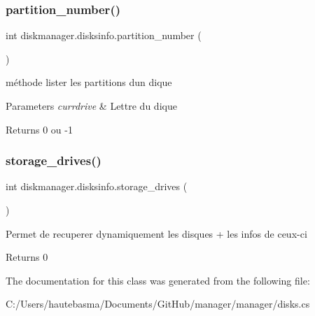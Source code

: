 \subsubsection{\texorpdfstring{partition\+\_\+number()}{partition\_number()}}
{\footnotesize\ttfamily int diskmanager.\+disksinfo.\+partition\+\_\+number (\begin{DoxyParamCaption}{ }\end{DoxyParamCaption})}



méthode lister les partitions d\textquotesingle{}un dique 


\begin{DoxyParams}{Parameters}
{\em currdrive} & Lettre du dique\\
\hline
\end{DoxyParams}
\begin{DoxyReturn}{Returns}
0 ou -\/1
\end{DoxyReturn}
\mbox{\label{classdiskmanager_1_1disksinfo_ae387fb2ba0e32b521f377aa814f29508}} 
\subsubsection{\texorpdfstring{storage\+\_\+drives()}{storage\_drives()}}
{\footnotesize\ttfamily int diskmanager.\+disksinfo.\+storage\+\_\+drives (\begin{DoxyParamCaption}{ }\end{DoxyParamCaption})}



Permet de recuperer dynamiquement les disques + les infos de ceux-\/ci 

\begin{DoxyReturn}{Returns}
0
\end{DoxyReturn}


The documentation for this class was generated from the following file\+:\begin{DoxyCompactItemize}
\item 
C\+:/\+Users/hautebasma/\+Documents/\+Git\+Hub/manager/manager/disks.\+cs\end{DoxyCompactItemize}
